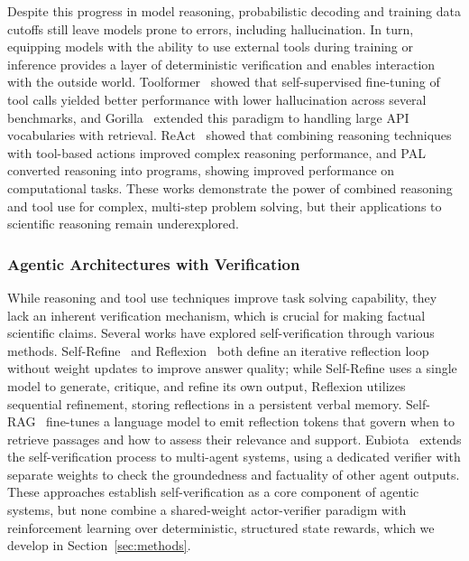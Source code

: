 \documentclass[thesis,letterpaper,12pt]{utthesis}
\begin{document}
Despite this progress in model reasoning, probabilistic decoding and training data cutoffs still leave models prone to errors, including hallucination. In turn, equipping models with the ability to use external tools during training or inference provides a layer of deterministic verification and enables interaction with the outside world. Toolformer~\cite{schick2023toolformer} showed that self-supervised fine-tuning of tool calls yielded better performance with lower hallucination across several benchmarks, and Gorilla~\cite{patil2024gorilla} extended this paradigm to handling large API vocabularies with retrieval. ReAct~\cite{yao2022react} showed that combining reasoning techniques with tool-based actions improved complex reasoning performance, and PAL~\cite{gao2023pal} converted reasoning into programs, showing improved performance on computational tasks. These works demonstrate the power of combined reasoning and tool use for complex, multi-step problem solving, but their applications to scientific reasoning remain underexplored.

\subsubsection{Agentic Architectures with Verification}
While reasoning and tool use techniques improve task solving capability, they lack an inherent verification mechanism, which is crucial for making factual scientific claims. Several works have explored self-verification through various methods. Self-Refine~\cite{madaan2023selfrefine} and Reflexion~\cite{shinn2023reflexion} both define an iterative reflection loop without weight updates to improve answer quality; while Self-Refine uses a single model to generate, critique, and refine its own output, Reflexion utilizes sequential refinement, storing reflections in a persistent verbal memory. Self-RAG~\cite{asai2023selfrag} fine-tunes a language model to emit reflection tokens that govern when to retrieve passages and how to assess their relevance and support. Eubiota~\cite{eubiota} extends the self-verification process to multi-agent systems, using a dedicated verifier with separate weights to check the groundedness and factuality of other agent outputs. These approaches establish self-verification as a core component of agentic systems, but none combine a shared-weight actor-verifier paradigm with reinforcement learning over deterministic, structured state rewards, which we develop in Section~\ref{sec:methods}.
\end{document}
